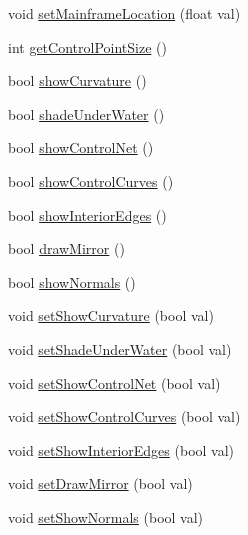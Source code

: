 \begin{DoxyCompactItemize}
\item 
void \hyperlink{classShipCAD_1_1SubdivisionSurface_a81d5637d3b405da5975eb8e86d058bcd}{set\-Mainframe\-Location} (float val)
\item 
int \hyperlink{classShipCAD_1_1SubdivisionSurface_a521c5ea29e765a0cf7bc0ec0268b499c}{get\-Control\-Point\-Size} ()
\item 
bool \hyperlink{classShipCAD_1_1SubdivisionSurface_ac7c4656b21e0aaa01525be5b7be84024}{show\-Curvature} ()
\item 
bool \hyperlink{classShipCAD_1_1SubdivisionSurface_adfb570208c96bf8bc3426a43fda5fe9f}{shade\-Under\-Water} ()
\item 
bool \hyperlink{classShipCAD_1_1SubdivisionSurface_a1886c21030a3c5c85797603d2d00c906}{show\-Control\-Net} ()
\item 
bool \hyperlink{classShipCAD_1_1SubdivisionSurface_ac94824bf3a085f9785bc49e659077156}{show\-Control\-Curves} ()
\item 
bool \hyperlink{classShipCAD_1_1SubdivisionSurface_a84834b65650ff350e993c00dccabab46}{show\-Interior\-Edges} ()
\item 
bool \hyperlink{classShipCAD_1_1SubdivisionSurface_a94d284672cca1fb619ef5c064bcd175b}{draw\-Mirror} ()
\item 
bool \hyperlink{classShipCAD_1_1SubdivisionSurface_a57a2abe37fef2cee7ca6c15ae5173672}{show\-Normals} ()
\item 
void \hyperlink{classShipCAD_1_1SubdivisionSurface_abf6fe62614aadf1cdd4f26fb4d3fc441}{set\-Show\-Curvature} (bool val)
\item 
void \hyperlink{classShipCAD_1_1SubdivisionSurface_a797d9b728f794b7f2fc61f1c51dacc06}{set\-Shade\-Under\-Water} (bool val)
\item 
void \hyperlink{classShipCAD_1_1SubdivisionSurface_af5380f1a7932b23a5fbf400c85542381}{set\-Show\-Control\-Net} (bool val)
\item 
void \hyperlink{classShipCAD_1_1SubdivisionSurface_aabf54bc152176697a82c0eb6e47f5981}{set\-Show\-Control\-Curves} (bool val)
\item 
void \hyperlink{classShipCAD_1_1SubdivisionSurface_a5a4e5acd1bfc4d845d28513dd2dbc0cd}{set\-Show\-Interior\-Edges} (bool val)
\item 
void \hyperlink{classShipCAD_1_1SubdivisionSurface_a3605a409a102a18714e9ad7d028e7f33}{set\-Draw\-Mirror} (bool val)
\item 
void \hyperlink{classShipCAD_1_1SubdivisionSurface_a678530145785bd366316b35d2bd0ab67}{set\-Show\-Normals} (bool val)
\item 

\end{DoxyCompactItemize}
